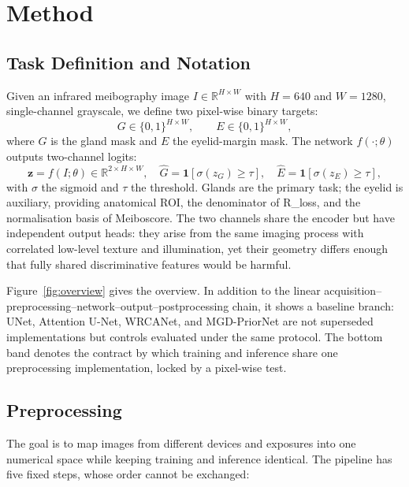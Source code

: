 \section{Method}\label{sec:method}

\subsection{Task Definition and Notation}

Given an infrared meibography image $I\in\mathbb{R}^{H\times W}$ with $H=640$ and $W=1280$, single-channel grayscale, we define two pixel-wise binary targets:
\begin{equation}
G\in\{0,1\}^{H\times W},\qquad E\in\{0,1\}^{H\times W},
\end{equation}
where $G$ is the gland mask and $E$ the eyelid-margin mask. The network $f(\cdot;\theta)$ outputs two-channel logits:
\begin{equation}
\mathbf{z}=f(I;\theta)\in\mathbb{R}^{2\times H\times W},\quad
\hat{G}=\mathbf{1}[\sigma(z_G)\ge \tau],\quad
\hat{E}=\mathbf{1}[\sigma(z_E)\ge \tau],
\end{equation}
with $\sigma$ the sigmoid and $\tau$ the threshold. Glands are the primary task; the eyelid is auxiliary, providing anatomical ROI, the denominator of R\_loss, and the normalisation basis of Meiboscore. The two channels share the encoder but have independent output heads: they arise from the same imaging process with correlated low-level texture and illumination, yet their geometry differs enough that fully shared discriminative features would be harmful.

Figure~\ref{fig:overview} gives the overview. In addition to the linear acquisition--preprocessing--network--output--postprocessing chain, it shows a baseline branch: UNet, Attention U-Net, WRCANet, and MGD-PriorNet are not superseded implementations but controls evaluated under the same protocol. The bottom band denotes the contract by which training and inference share one preprocessing implementation, locked by a pixel-wise test.



\subsection{Preprocessing}

The goal is to map images from different devices and exposures into one numerical space while keeping training and inference identical. The pipeline has five fixed steps, whose order cannot be exchanged:


